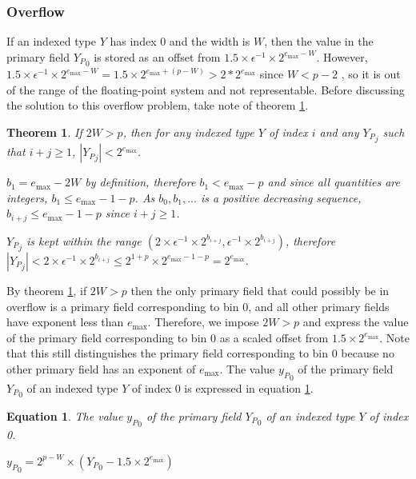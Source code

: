 \documentclass[12pt]{article}
\providecommand{\max}{\ensuremath{\text{max}}}
\theoremstyle{plain}
\newtheorem{thm}{Theorem}[section]
\newtheorem{eq}{Equation}[section]
\begin{document}
    \subsubsection{Overflow}
      \label{sec:overflow}
      If an indexed type $Y$ has index 0 and the width is $W$, then the value in the primary field ${Y_P}_0$ is stored as an offset from $1.5\times\epsilon^{-1}\times2^{e_{\max} - W}$. However, $1.5\times\epsilon^{-1}\times2^{e_{\max} - W} = 1.5 \times 2^{e_{\max} + (p - W)} > 2 * 2^{e_{\max}}$ since $W < p - 2$ \cite{repsum}, so it is out of the range of the floating-point system and not representable. Before discussing the solution to this overflow problem, take note of theorem \ref{thm:overflow}.
      \begin{thm}
        If $2W > p$, then for any indexed type $Y$ of index $i$ and any ${Y_P}_j$ such that $i + j \geq 1$, $|{Y_P}_j| < 2^{e_{\max}}$.

        $b_1 = e_{\max} - 2W$ by definition, therefore $b_1 < e_{\max} - p$ and since all quantities are integers, $b_1 \leq e_{\max} - 1 - p$. As $b_0, b_1, ...$ is a positive decreasing sequence, $b_{i + j} \leq e_{\max} - 1 - p$ since $i + j \geq 1$.

        ${Y_P}_j$ is kept within the range $(2 \times \epsilon^{-1} \times 2^{b_{i + j}}, \epsilon^{-1} \times 2^{b_{i + j}})$, therefore 
        $|{Y_P}_j| < 2 \times \epsilon^{-1} \times 2^{b_{i + j}} \leq 2^{1 + p} \times 2^{e_{\max} - 1 - p} = 2^{e_{\max}}$.

        \label{thm:overflow}
      \end{thm}
      By theorem \ref{thm:overflow}, if $2W > p$ then the only primary field that could possibly be in overflow is a primary field corresponding to bin 0, and all other primary fields have exponent less than $e_{\max}$. Therefore, we impose $2W > p$ and express the value of the primary field corresponding to bin 0 as a scaled offset from $1.5\times2^{e_{\max}}$. Note that this still distinguishes the primary field corresponding to bin 0 because no other primary field has an exponent of $e_{\max}$. The value ${y_P}_0$ of the primary field ${Y_P}_0$ of an indexed type $Y$ of index 0 is expressed in equation \ref{eq:pri0}.
      \begin{eq} The value ${y_P}_0$ of the primary field ${Y_P}_0$ of an indexed type $Y$ of index 0.

        ${y_P}_0 = 2^{p - W}\times({Y_P}_0 - 1.5\times2^{e_{\max}})$
        \label{eq:pri0}
      \end{eq}
\end{document}
